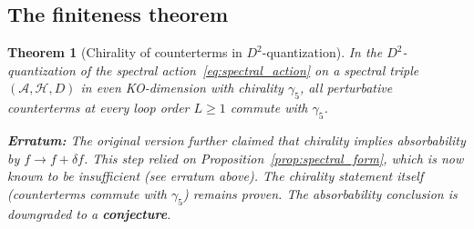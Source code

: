 \documentclass[12pt,a4paper]{article}
\newtheorem{theorem}{Theorem}[section]
\theoremstyle{definition}
\theoremstyle{remark}
\newcommand{\Hilb}{\mathcal{H}}
\newcommand{\Alg}{\mathcal{A}}
\begin{document}
\subsection{The finiteness theorem}

\begin{theorem}[Chirality of counterterms in $D^2$-quantization]\label{thm:finiteness}
In the $D^2$-quantization of the spectral action~\eqref{eq:spectral_action}
on a spectral triple $(\Alg, \Hilb, D)$ in even KO-dimension with chirality
$\gamma_5$, all perturbative counterterms at every loop order $L \geq 1$
commute with $\gamma_5$.

\textbf{Erratum:} The original version further claimed that chirality
implies absorbability by $f \to f + \delta f$. This step relied on
Proposition~\ref{prop:spectral_form}, which is now known to be
insufficient (see erratum above). The chirality statement itself
(counterterms commute with $\gamma_5$) remains proven. The
absorbability conclusion is downgraded to a \textbf{conjecture}.
\end{theorem}
\end{document}
